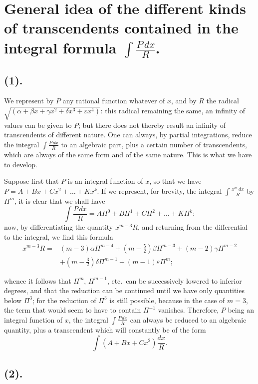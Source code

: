 \documentclass{article}
\begin{document}
\section*{General idea of the different kinds of transcendents contained in the integral formula $\displaystyle\int\frac{P\,dx}{R}$.}

\subsection*{(1).}

We represent by $P$ any rational function whatever of $x$, and by $R$ the radical $\sqrt{(\alpha+\beta x+\gamma x^{2}+\delta x^{3}+\varepsilon x^{4})}$: this radical remaining the same, an infinity of values can be given to $P$; but there does not thereby result an infinity of transcendents of different nature. One can always, by partial integrations, reduce the integral $\displaystyle\int\frac{P\,dx}{R}$ to an algebraic part, plus a certain number of transcendents, which are always of the same form and of the same nature. This is what we have to develop.

Suppose first that $P$ is an integral function of $x$, so that we have $P=A+Bx+Cx^{2}+\ldots+Kx^{k}$. If we represent, for brevity, the integral $\displaystyle\int\frac{x^{m}\,dx}{R}$ by $\Pi^{m}$, it is clear that we shall have
\[ \int\frac{P\,dx}{R}=A\Pi^{0}+B\Pi^{1}+C\Pi^{2}+\ldots+K\Pi^{k}: \]
now, by differentiating the quantity $x^{m-3}R$, and returning from the differential to the integral, we find this formula
\[ \begin{aligned} x^{m-3}R={}&(m-3)\alpha\Pi^{m-4}+(m-\tfrac{5}{2})\beta\Pi^{m-3}+(m-2)\gamma\Pi^{m-2}\\ &+(m-\tfrac{3}{2})\delta\Pi^{m-1}+(m-1)\varepsilon\Pi^{m}; \end{aligned} \]

whence it follows that $\Pi^{m}$, $\Pi^{m-1}$, etc.\ can be successively lowered to inferior degrees, and that the reduction can be continued until we have only quantities below $\Pi^{3}$; for the reduction of $\Pi^{3}$ is still possible, because in the case of $m=3$, the term that would seem to have to contain $\Pi^{-1}$ vanishes. Therefore, $P$ being an integral function of $x$, the integral $\displaystyle\int\frac{P\,dx}{R}$ can always be reduced to an algebraic quantity, plus a transcendent which will constantly be of the form
\[ \int(A+Bx+Cx^{2})\frac{dx}{R}. \]

\subsection*{(2).}
\end{document}
